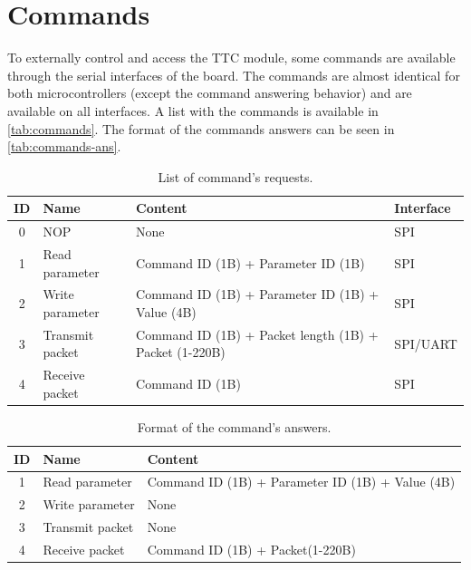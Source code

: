 \section{Commands} \label{sec:commands}

To externally control and access the TTC module, some commands are available through the serial interfaces of the board. The commands are almost identical for both microcontrollers (except the command answering behavior) and are available on all interfaces. A list with the commands is available in \autoref{tab:commands}. The format of the commands answers can be seen in \autoref{tab:commands-ans}.

\begin{table}[!ht]
    \centering
    \scriptsize
    \begin{tabular}{clll}
        \toprule[1.5pt]
        \textbf{ID} & \textbf{Name} & \textbf{Content} & \textbf{Interface}\\
        \midrule
        0   & NOP               & None                                           & SPI \\
        1   & Read parameter     & Command ID (1B) + Parameter ID (1B)   & SPI \\
        2   & Write parameter   & Command ID (1B) + Parameter ID (1B) + Value (4B) & SPI \\
        3   & Transmit packet   & Command ID (1B) + Packet length (1B)  + Packet (1-220B)         & SPI/UART \\
        4   & Receive packet    & Command ID (1B)      & SPI \\
        \bottomrule[1.5pt]
    \end{tabular}
    \caption{List of command's requests.}
    \label{tab:commands}
\end{table}

\begin{table}[!ht]
    \centering
    \scriptsize
    \begin{tabular}{cll}
        \toprule[1.5pt]
        \textbf{ID} & \textbf{Name} & \textbf{Content}\\
        \midrule
        1   & Read parameter    & Command ID (1B) + Parameter ID (1B) + Value (4B) \\
        2   & Write parameter   & None \\
        3   & Transmit packet   & None \\
        4   & Receive packet    & Command ID (1B) + Packet(1-220B) \\
        \bottomrule[1.5pt]
    \end{tabular}
    \caption{Format of the command's answers.}
    \label{tab:commands-ans}
\end{table}


